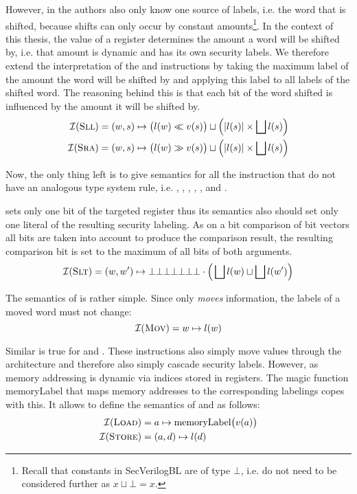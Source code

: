 However, in \cite{Ferraiuolo17} the authors also only know one source of labels, i.e. the word that is shifted, because shifts can only occur by constant amounts\footnote{%
    Recall that constants in SecVerilogBL are of type $ \bot $, i.e. do not need to be considered further as $ x \sqcup \bot = x $.
}.
In the context of this thesis, the value of a register determines the amount a word will be shifted by, i.e. that amount is dynamic and has its own security labels.
We therefore extend the interpretation of the  and  instructions by taking the maximum label of the amount the word will be shifted by and applying this label to all labels of the shifted word.
The reasoning behind this is that each bit of the word shifted is influenced by the amount it will be shifted by.
\begin{align*}
    \mathcal{I}(\textsc{Sll}) &= (w, s) \mapsto \big(l(w) \ll v(s) \big) \sqcup \Big(|l(s)| \times \bigsqcup l(s) \Big) \\
    \mathcal{I}(\textsc{Sra}) &= (w, s) \mapsto \big(l(w) \gg v(s) \big) \sqcup \Big(|l(s)| \times \bigsqcup l(s) \Big)
\end{align*}

Now, the only thing left is to give semantics for all the instruction that do not have an analogous type system rule, i.e. , , , , ,  and .

 sets only one bit of the targeted register thus its semantics also should set only one literal of the resulting security labeling.
As on a bit comparison of bit vectors all bits are taken into account to produce the comparison result, the resulting comparison bit is set to the maximum of all bits of both arguments.
\begin{equation*}
    \mathcal{I}(\textsc{Slt}) = (w, w') \mapsto \bot\bot\bot\bot\bot\bot\bot \cdot \Big(\bigsqcup l(w) \sqcup \bigsqcup l(w') \Big)
\end{equation*}

The semantics of  is rather simple.
Since  only \textit{moves} information, the labels of a moved word must not change:
\begin{equation*}
    \mathcal{I}(\textsc{Mov}) = w \mapsto l(w)
\end{equation*}

Similar is true for  and .
These instructions also simply move values through the architecture and therefore also simply cascade security labels.
However, as memory addressing is dynamic via indices stored in registers.
The magic function \mbox{memoryLabel} that maps memory addresses to the corresponding labelings copes with this.
It allows to define the semantics of  and  as follows:
\begin{align*}
    \mathcal{I}(\textsc{Load}) &= a \mapsto \text{memoryLabel}\big(v(a) \big) \\
    \mathcal{I}(\textsc{Store}) &= (a, d) \mapsto l(d)
\end{align*}

